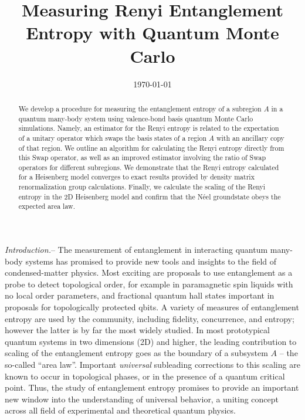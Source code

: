 \documentclass[prl,aps,twocolumn,floatfix,amsmath,amssymb,superscriptaddress,tightenlines]{revtex4}
\begin{document}
\date{\today}
\title{Measuring Renyi Entanglement Entropy with Quantum Monte Carlo}

%
%
%

\begin{abstract} 
We develop a procedure for measuring the entanglement entropy of a subregion $A$ in a quantum
many-body system using valence-bond basis quantum Monte Carlo simulations.  Namely, an 
estimator for the Renyi entropy is related to the expectation of a unitary operator which swaps the 
basis states of a region $A$ with an ancillary copy of that region.  We outline an algorithm for 
calculating the Renyi entropy directly from this Swap operator, as well as an improved estimator
involving the ratio of Swap operators for different subregions.
We demonstrate that the Renyi entropy calculated for a Heisenberg model  
converges to exact results provided by density matrix renormalization group calculations.  Finally, we 
calculate the scaling of the Renyi entropy in the 2D Heisenberg model and confirm that the N\'eel 
groundstate obeys the expected area law.
\end{abstract}
\maketitle

{\it Introduction.}-- 
The measurement of entanglement in interacting quantum many-body systems has promised to provide
new tools and insights to the field of condensed-matter physics.  Most exciting are proposals to use 
entanglement as a probe to detect topological order, for example in paramagnetic spin liquids with no 
local order parameters, and fractional quantum hall states important in proposals for topologically protected qbits.  
A variety of measures of entanglement entropy are used by the community, including fidelity, concurrence, and entropy;
however the latter is by far the most widely studied.  In most prototypical quantum systems in two dimensions (2D) and higher, the 
leading contribution to scaling of the entanglement entropy goes as the boundary of a subsystem $A$ -- the so-called
``area law''.  Important {\it universal} subleading corrections to this scaling are known to occur in topological phases, or 
in the presence of a quantum critical point.  Thus, the study of entanglement entropy promises to provide an important new 
window into the understanding of universal behavior, a uniting concept across all field of experimental and theoretical 
quantum physics.
\end{document}
